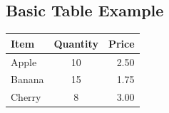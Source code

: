 \documentclass[12pt, a4paper]{article}
\begin{document}
\begin{english}

\section*{Basic Table Example}

\begin{tabular}{lcr}
  \hline
  Item    & Quantity & Price \\
  \hline
  Apple   & 10       & 2.50  \\
  Banana  & 15       & 1.75  \\
  Cherry  & 8        & 3.00  \\
  \hline
\end{tabular}

\end{english}
\end{document}
